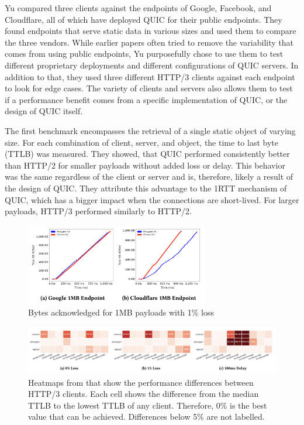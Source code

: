 \documentclass[conference]{IEEEtran}
\begin{document}
Yu compared three clients against the endpoints of Google, Facebook, and Cloudflare, all of which have deployed QUIC for their public endpoints. They found endpoints that serve static data in various sizes and used them to compare the three vendors. While earlier papers often tried to remove the variability that comes from using public endpoints, Yu purposefully chose to use them to test different proprietary deployments and different configurations of QUIC servers. In addition to that, they used three different HTTP/3 clients against each endpoint to look for edge cases. The variety of clients and servers also allows them to test if a performance benefit comes from a specific implementation of QUIC, or the design of QUIC itself.

The first benchmark encompasses the retrieval of a single static object of varying size. For each combination of client, server, and object, the time to last byte (TTLB) was measured. They showed, that QUIC performed consistently better than HTTP/2 for smaller payloads without added loss or delay. This behavior was the same regardless of the client or server and is, therefore, likely a result of the design of QUIC. They attribute this advantage to the 1RTT mechanism of QUIC, which has a bigger impact when the connections are short-lived. For larger payloads, HTTP/3 performed similarly to HTTP/2.

\begin{figure}[htbp]
\includegraphics[width=8cm,keepaspectratio]{images/Yu2/Cloudflare anomaly.png}
\caption{Bytes acknowledged for 1MB payloads with 1\% loss \cite{Yu2}}
\label{fig:yu2-cloudflare-anomaly}
\end{figure}

\begin{figure}[h]
\includegraphics[width=\textwidth,keepaspectratio]{images/Yu2/HTTP3 Single object benchmarks.png}
\caption{Heatmaps from \cite{Yu2} that show the performance differences between HTTP/3 clients. Each cell shows the difference from the median TTLB to the lowest TTLB of any client. Therefore, 0\% is the best value that can be achieved. Differences below 5\% are not labelled.}
\label{fig:yu2-http3-single-object-benchmark}
\end{figure}
\end{document}
